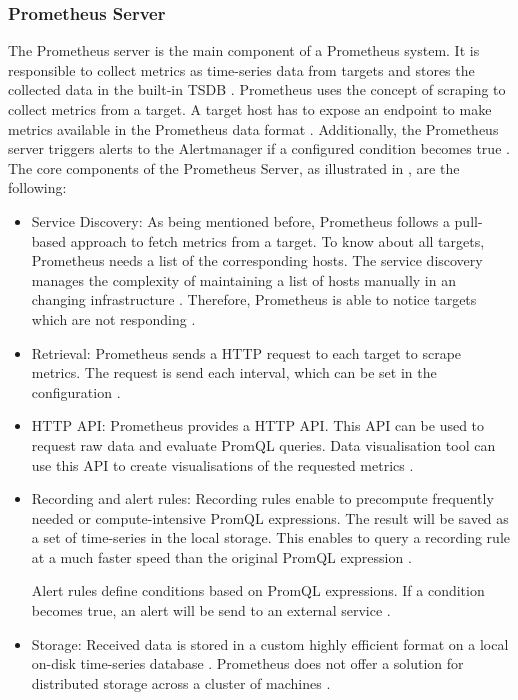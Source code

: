 \subsubsection{Prometheus Server}
The Prometheus server is the main component of a Prometheus system. It is responsible to collect metrics as time-series data from targets and stores the collected data in the built-in TSDB \cite{Bastos2019Prom}. Prometheus uses the concept of scraping to collect metrics from a target. A target host has to expose an endpoint to make metrics available in the Prometheus data format \cite{Pandey2020Monitoring}. Additionally, the Prometheus server triggers alerts to the Alertmanager if a configured condition becomes true \cite{Prom2020Docs}.
The core components of the Prometheus Server, as illustrated in , are the following:

\begin{itemize}
\item Service Discovery:
As being mentioned before, Prometheus follows a pull-based approach to fetch metrics from a target. To know about all targets, Prometheus needs a list of the corresponding hosts. The service discovery manages the complexity of maintaining a list of hosts manually in an changing infrastructure \cite{Bastos2019Prom}. Therefore, Prometheus is able to notice targets which are not responding \cite{Brazil2018Prom}.

\item Retrieval:
Prometheus sends a HTTP request to each target to scrape metrics. The request is send each interval, which can be set in the configuration \cite{Brazil2018Prom}.

\item HTTP API:
Prometheus provides a HTTP API. This API can be used to request raw data and evaluate PromQL queries.
Data visualisation tool can use this API to create visualisations of the requested metrics \cite{Brazil2018Prom}.

\item Recording and alert rules:
Recording rules enable to precompute frequently needed or compute-intensive PromQL expressions. The result will be saved as a set of time-series in the local storage. This enables to query a recording rule at a much faster speed than the original PromQL expression \cite{Brazil2018Prom, Prom2020Docs}.

Alert rules define conditions based on PromQL expressions. If a condition becomes true, an alert will be send to an external service \cite{Prom2020Docs}.

\item Storage:
Received data is stored in a custom highly efficient format on a local on-disk time-series database \cite{Prom2020Docs}. Prometheus does not offer a solution for distributed storage across a cluster of machines \cite{Brazil2018Prom}.
\end{itemize}


